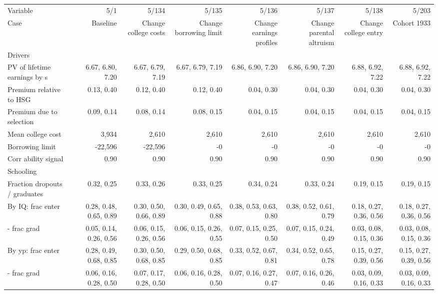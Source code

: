 \begin{tabular}{lrrrrrrr}
\hline
Variable & 5/1  & 5/134  & 5/135  & 5/136  & 5/137  & 5/138  & 5/203  \\ 
Case & Baseline  & Change college costs  & Change borrowing limit  & Change earnings profiles  & Change parental altruism  & Change college entry  & Cohort 1933  \\ 
Drivers &   &   &   &   &   &   &   \\ 
PV of lifetime earnings by s & 6.67, 6.80, 7.20  & 6.67, 6.79, 7.19  & 6.67, 6.79, 7.19  & 6.86, 6.90, 7.20  & 6.86, 6.90, 7.20  & 6.88, 6.92, 7.22  & 6.88, 6.92, 7.22  \\ 
Premium relative to HSG & 0.13, 0.40  & 0.12, 0.40  & 0.12, 0.40  & 0.04, 0.30  & 0.04, 0.30  & 0.04, 0.30  & 0.04, 0.30  \\ 
Premium due to selection & 0.09, 0.14  & 0.08, 0.14  & 0.08, 0.15  & 0.04, 0.15  & 0.04, 0.15  & 0.04, 0.15  & 0.04, 0.15  \\ 
Mean college cost & 3,934  & 2,610  & 2,610  & 2,610  & 2,610  & 2,610  & 2,610  \\ 
Borrowing limit & -22,596  & -22,596  & -0  & -0  & -0  & -0  & -0  \\ 
Corr ability signal & 0.90  & 0.90  & 0.90  & 0.90  & 0.90  & 0.90  & 0.90  \\ 
\hline
Schooling &   &   &   &   &   &   &   \\ 
Fraction dropouts / graduates & 0.32, 0.25  & 0.33, 0.26  & 0.33, 0.25  & 0.34, 0.24  & 0.33, 0.24  & 0.19, 0.15  & 0.19, 0.15  \\ 
By IQ: frac enter & 0.28, 0.48, 0.65, 0.89  & 0.30, 0.50, 0.66, 0.89  & 0.30, 0.49, 0.65, 0.88  & 0.38, 0.53, 0.63, 0.80  & 0.38, 0.52, 0.61, 0.79  & 0.18, 0.27, 0.36, 0.56  & 0.18, 0.27, 0.36, 0.56  \\ 
- frac grad & 0.05, 0.14, 0.26, 0.56  & 0.06, 0.15, 0.26, 0.56  & 0.06, 0.15, 0.26, 0.55  & 0.07, 0.15, 0.25, 0.50  & 0.07, 0.15, 0.24, 0.49  & 0.03, 0.08, 0.15, 0.36  & 0.03, 0.08, 0.15, 0.36  \\ 
By yp: frac enter & 0.28, 0.49, 0.68, 0.85  & 0.30, 0.50, 0.68, 0.85  & 0.29, 0.50, 0.68, 0.85  & 0.33, 0.52, 0.67, 0.81  & 0.34, 0.52, 0.65, 0.78  & 0.15, 0.27, 0.39, 0.56  & 0.15, 0.27, 0.39, 0.56  \\ 
- frac grad & 0.06, 0.16, 0.28, 0.50  & 0.07, 0.17, 0.28, 0.50  & 0.06, 0.16, 0.28, 0.50  & 0.07, 0.16, 0.27, 0.47  & 0.07, 0.16, 0.26, 0.46  & 0.03, 0.09, 0.16, 0.33  & 0.03, 0.09, 0.16, 0.33  \\ 

\end{tabular}
